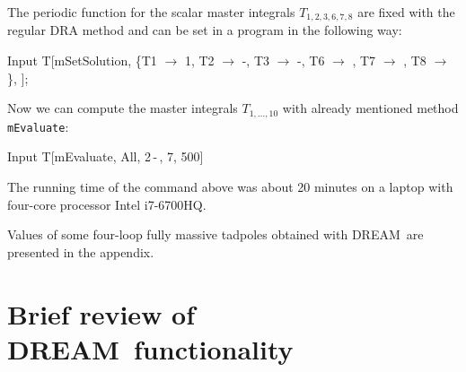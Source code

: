 \documentclass[sort&compress]{elsarticle}
\begin{document}
The periodic function for the scalar master integrals $T_{1,2,3,6,7,8}$ are fixed with the regular DRA method and can be set in a program in the following way:
\begin{mmaCell}[moredefined={T,T1,T2,T3,T6,T7,T8,mSetSolution}]{Input}
	T[mSetSolution, \{T1 \(\to\) 1, T2 \(\to\) -,
	  T3 \(\to\) -,
	  T6 \(\to\) , T7 \(\to\) ,
	  T8 \(\to\) \}, \mmaUnd{\(\nu\)}];
\end{mmaCell}
Now we can compute the master integrals $T_{1, \ldots, 10}$ with already mentioned method \texttt{mEvaluate}:
\begin{mmaCell}[moredefined={T,mEvaluate}]{Input}
	T[mEvaluate, All, 2\,-\,\mmaUnd{\(\epsilon\)}, 7, 500]
\end{mmaCell}
The running time of the command above was about 20 minutes on a laptop with four-core processor Intel i7-6700HQ.

Values of some four-loop fully massive tadpoles obtained with DREAM\ are presented in the appendix.

\section{Brief review of DREAM\ functionality}
\label{sec:dream-manual}
\end{document}
